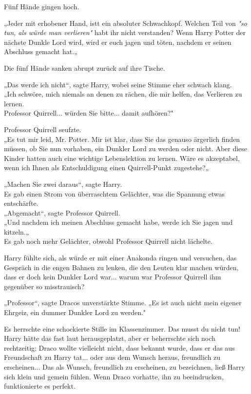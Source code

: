 {Fünf Hände gingen hoch.

„Jeder mit erhobener Hand, istt ein absoluter Schwachkopf. Welchen Teil von \emph{"so tun, als würde man verlieren"} habt ihr nicht verstanden? Wenn Harry Potter der nächste Dunkle Lord wird, wird er euch jagen und töten, nachdem er seinen Abschluss gemacht hat.„

Die fünf Hände sanken abrupt zurück auf ihre Tische.

„Das werde ich nicht“, sagte Harry, wobei seine Stimme eher schwach klang.\\ „Ich schwöre, mich niemals an denen zu rächen, die mir helfen, das Verlieren zu lernen.\\ Professor Quirrell... würden Sie bitte... damit aufhören?"

Professor Quirrell seufzte.\\ „Es tut mir leid, Mr. Potter. Mir ist klar, dass Sie das genauso ärgerlich finden müssen, ob Sie nun vorhaben, ein Dunkler Lord zu werden oder nicht. Aber diese Kinder hatten auch eine wichtige Lebenslektion zu lernen. Wäre es akzeptabel, wenn ich Ihnen als Entschuldigung einen Quirrell-Punkt zugestehe?„

„Machen Sie zwei daraus“, sagte Harry.\\ Es gab einen Strom von überraschtem Gelächter, was die Spannung etwas entschärfte.\\ „Abgemacht“, sagte Professor Quirrell.\\ „Und nachdem ich meinen Abschluss gemacht habe, werde ich Sie jagen und kitzeln.„\\ Es gab noch mehr Gelächter, obwohl Professor Quirrell nicht lächelte.

Harry fühlte sich, als würde er mit einer Anakonda ringen und versuchen, das Gespräch in die engen Bahnen zu lenken, die den Leuten klar machen würden, dass er doch kein Dunkler Lord war... warum war Professor Quirrell ihm gegenüber so misstrauisch?

„Professor“, sagte Dracos unverstärkte Stimme. „Es ist auch nicht mein eigener Ehrgeiz, ein dummer Dunkler Lord zu werden."

Es herrschte eine schockierte Stille im Klassenzimmer. Das musst du nicht tun! Harry hätte das fast laut herausgeplatzt, aber er beherrschte sich noch rechtzeitig; Draco wollte vielleicht nicht, dass bekannt wurde, dass er das aus Freundschaft zu Harry tat... oder aus dem Wunsch heraus, freundlich zu erscheinen... Das als Wunsch, freundlich zu erscheinen, zu bezeichnen, ließ Harry sich klein und gemein fühlen. Wenn Draco vorhatte, ihn zu beeindrucken, funktionierte es perfekt.

}
